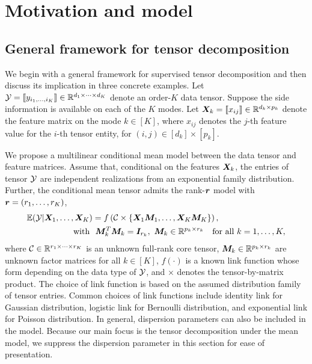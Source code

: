 \documentclass[12pt]{article}
\theoremstyle{definition}
\theoremstyle{definition}
\begin{document}
\section{Motivation and model}\label{sec:model}
\subsection{General framework for tensor decomposition}\label{sec:mainmodel}
We begin with a general framework for supervised tensor decomposition and then discuss its implication in three concrete examples. Let $\mathcal{Y}=\llbracket y_{i_1,\ldots,i_K} \rrbracket\in\mathbb{R}^{d_1\times \cdots\times d_K}$ denote an order-$K$ data tensor. Suppose the side information is available on each of the $K$ modes. Let $\bm X_k=\llbracket x_{ij} \rrbracket\in\mathbb{R}^{d_k\times p_k}$ denote the feature matrix on the mode $k\in[K]$, where $x_{ij}$ denotes the $j$-th feature value for the $i$-th tensor entity, for $(i,j)\in[d_k]\times[p_k]$. 

We propose a multilinear conditional mean model between the data tensor and feature matrices. Assume that, conditional on the features $\bm X_k$, the entries of tensor $\mathcal{Y}$ are independent realizations from an exponential family distribution. Further, the conditional mean tensor admits the rank-$\bm{r}$ model with $\bm{r}=(r_1,\ldots,r_K)$,
\begin{align}\label{eq:decomp}
\mathbb{E}(\tY|\mX_1,\ldots,\mX_K) &= f\left(\tC\times\{\mX_1\mM_1, \ldots, \mX_K\mM_K\}\right),\notag\\
\text{with} \ &\ \mM_k^T\mM_k = \mI_{r_k},\ \mM_k\in\mathbb{R}^{p_k\times r_k}\quad \text{for all }k=1,\ldots,K,
\end{align}
where $\mathcal{C} \in \mathbb{R}^{r_1\times \cdots \times r_K}$ is an unknown full-rank core tensor, $\bm M_k \in \mathbb{R}^{p_k\times r_k}$ are unknown factor matrices for all $k\in [K]$, $f(\cdot)$ is a known link function whose form depending on the data type of $\mathcal{Y}$, and $\times$ denotes the tensor-by-matrix product. The choice of link function is based on the assumed distribution family of tensor entries. Common choices of link functions include identity link for Gaussian distribution, logistic link for Bernoulli distribution, and exponential link for Poisson distribution. In general, dispersion parameters can also be included in the model. Because our main focus is the tensor decomposition under the mean model, we suppress the dispersion parameter in this section for ease of presentation. 
\end{document}
